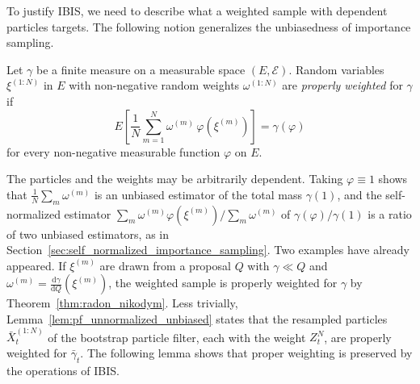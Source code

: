 To justify IBIS, we need to describe what a weighted sample with dependent particles targets. The following notion generalizes the unbiasedness of importance sampling.

\begin{definition}
    \label{def:proper_weighting}
    Let $\gamma$ be a finite measure on a measurable space $(E,\mathcal{E})$. Random variables $\xi^{(1:N)}$ in $E$ with non-negative random weights $\omega^{(1:N)}$ are \emph{properly weighted} for $\gamma$ if
    \begin{equation}
        E\left[\frac{1}{N}\sum_{m=1}^{N}\omega^{(m)}\,\varphi(\xi^{(m)})\right] = \gamma(\varphi)
        \label{eq:proper_weighting}
    \end{equation}
    for every non-negative measurable function $\varphi$ on $E$.
\end{definition}

The particles and the weights may be arbitrarily dependent. Taking $\varphi\equiv1$ shows that $\frac{1}{N}\sum_m\omega^{(m)}$ is an unbiased estimator of the total mass $\gamma(1)$, and the self-normalized estimator $\sum_m\omega^{(m)}\varphi(\xi^{(m)})/\sum_m\omega^{(m)}$ of $\gamma(\varphi)/\gamma(1)$ is a ratio of two unbiased estimators, as in Section~\ref{sec:self_normalized_importance_sampling}. Two examples have already appeared. If $\xi^{(m)}$ are drawn from a proposal $Q$ with $\gamma\ll Q$ and $\omega^{(m)} = \frac{\mathrm{d}\gamma}{\mathrm{d}Q}(\xi^{(m)})$, the weighted sample is properly weighted for $\gamma$ by Theorem~\ref{thm:radon_nikodym}. Less trivially, Lemma~\ref{lem:pf_unnormalized_unbiased} states that the resampled particles $\bar{X}_t^{(1:N)}$ of the bootstrap particle filter, each with the weight $Z_t^N$, are properly weighted for $\bar{\gamma}_t$. The following lemma shows that proper weighting is preserved by the operations of IBIS.


